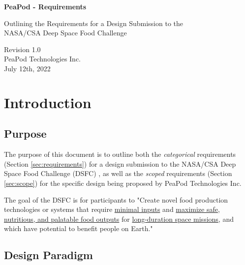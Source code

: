 \documentclass{../tex/report}
\begin{document}
\begin{titlepage}
    \begin{center}
        \vspace*{1.2cm}

        \textbf{\large{PeaPod - Requirements}}

        \vspace{0.5cm}

        Outlining the Requirements for a Design Submission to the \\NASA/CSA Deep Space Food Challenge

        \vfill
        
        \vspace{1.25cm}

        Revision 1.0\\
        PeaPod Technologies Inc.\\
        July 12th, 2022

    \end{center}
\end{titlepage}

\thispagestyle{plain}

\tableofcontents
\clearpage

\section{Introduction}
\label{sec:intro}

\subsection{Purpose}
\label{sec:purpose}

The purpose of this document is to outline both the \textit{categorical} requirements (Section \ref{sec:requirements}) for a design submission to the NASA/CSA Deep Space Food Challenge (DSFC) \cite{dsfc}, as well as the \textit{scoped} requirements (Section \ref{sec:scope}) for the specific design being proposed by PeaPod Technologies Inc.

The goal of the DSFC is for participants to "Create novel food production technologies or systems that require \uline{minimal inputs} and \uline{maximize safe, nutritious, and palatable food outputs} for \uline{long-duration space missions}, and which have potential to benefit people on Earth." \cite{applicantguide}

\subsection{Design Paradigm}
\label{sec:structure}
\end{document}

